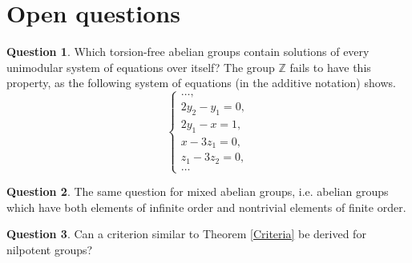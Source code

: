 \documentclass{article}
\theoremstyle{definition}
\newtheorem{question}{Question}
\theoremstyle{remark}
\begin{document}
\section{Open questions} \label{OpenQuest}

\begin{question} \label{torsionfreebad}
Which torsion-free abelian groups contain solutions
of every unimodular system of equations over itself?
The group $\mathbb Z$ fails to have this property, as the following
system of equations (in the additive notation) shows.
$$
\begin{cases}
\ldots,\\
2y_2 - y_1 = 0,\\
2y_1 - x = 1,\\
x - 3z_1 = 0,\\
z_1 - 3z_2 = 0,\\
\ldots
\end{cases}
$$
\end{question}

\begin{question}
The same question for mixed abelian groups, i.e.
abelian groups which have
both elements of infinite order and
nontrivial elements of finite order.
\end{question}

\begin{question}
Can a criterion similar to Theorem
\ref{Criteria} be derived for nilpotent groups?
\end{question}
\end{document}
